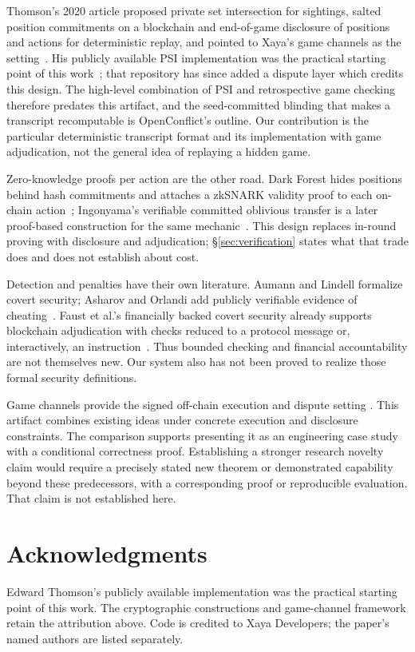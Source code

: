\documentclass[11pt]{article}
\begin{document}
Thomson's 2020 article proposed private set intersection for sightings,
salted position commitments on a blockchain and end-of-game disclosure of
positions and actions for deterministic replay, and pointed to Xaya's game
channels as the setting~\cite{thomsonblog}. His publicly available PSI
implementation was the practical starting point of this
work~\cite{thomsonpsi}; that repository
has since added a dispute layer which credits this design. The high-level
combination of PSI and retrospective game checking therefore predates this
artifact, and the seed-committed blinding that makes a transcript
recomputable is OpenConflict's outline. Our contribution is the particular
deterministic transcript format and its implementation with game
adjudication, not the general idea of replaying a hidden game.

Zero-knowledge proofs per action are the other road. Dark Forest hides
positions behind hash commitments and attaches a zkSNARK validity proof to
each on-chain action~\cite{darkforest}; Ingonyama's verifiable committed
oblivious transfer is a later proof-based construction for the same
mechanic~\cite{ingonyama24}. This design replaces in-round proving with
disclosure and adjudication; \S\ref{sec:verification} states what that trade
does and does not establish about cost.

Detection and penalties have their own literature. Aumann and Lindell formalize
covert security; Asharov and Orlandi add publicly verifiable evidence of
cheating~\cite{al07,ao12}. Faust et al.'s financially backed covert security
already supports blockchain adjudication with checks reduced to a protocol
message or, interactively, an instruction~\cite{fhks22}. Thus bounded checking
and financial accountability are not themselves new. Our system also has not
been proved to realize those formal security definitions.

Game channels provide the signed off-chain execution and dispute setting
\cite{kraft16}. This artifact combines existing ideas under concrete execution
and disclosure constraints. The comparison supports presenting it as an
engineering case study with a conditional correctness proof. Establishing a
stronger research novelty claim would require a precisely stated new theorem
or demonstrated capability beyond these predecessors, with a corresponding
proof or reproducible evaluation. That claim is not established here.

\section*{Acknowledgments}
Edward Thomson's publicly available implementation was the practical starting
point of this work. The
cryptographic constructions and game-channel framework retain the attribution
above. Code is credited to Xaya Developers; the paper's named authors are
listed separately.
\end{document}
